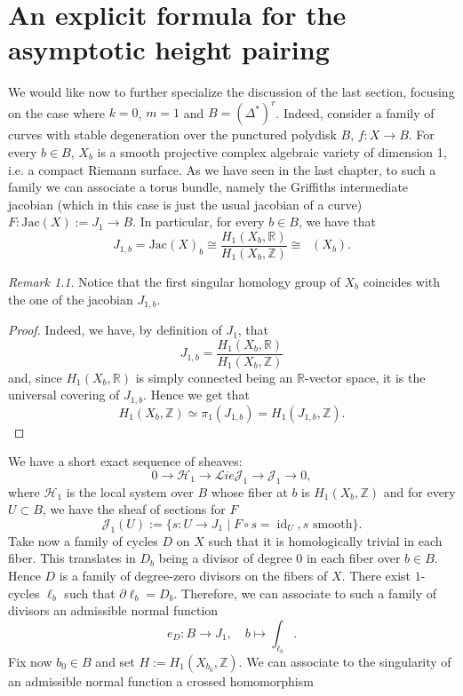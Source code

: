 \documentclass[a4paper,12 pt,titlepage,twoside]{book}
\newcommand{\numberset}{\mathbb}
\newcommand{\Z}{\numberset{Z}}
\newcommand{\R}{\numberset{R}}
\newcommand{\Lie}{\mathcal{L}ie}
\DeclareMathOperator{\id}{id}
\DeclareMathOperator{\pico}{Pic^0}
\theoremstyle{plain}
\theoremstyle{theorem}
\theoremstyle{definition}
\theoremstyle{remark}
\newtheorem{oss}[thm]{Remark}
\begin{document}
\chapter{An explicit formula for the asymptotic height pairing}\label{sec: an explicit formula for the ahp}
	We would like now to further specialize the discussion of the last section, focusing on the case where $k=0$, $m=1$ and $B = (\Delta^*)^r$. Indeed, consider a family of curves with stable degeneration over the punctured polydisk $B$, $ f \colon X \rightarrow B.$ For every $b \in B$, $X_b$ is a smooth projective complex algebraic variety of dimension 1, i.e. a compact Riemann surface. As we have seen in the last chapter, to such a family we can associate a torus bundle, namely the Griffiths intermediate jacobian (which in this case is just the usual jacobian of a curve) $F \colon \text{Jac}(X) := J_1 \rightarrow B.$ In particular, for every $b \in B$, we have that $$J_{1,b} = \text{Jac}(X)_b \cong \frac{H_1(X_b,\R)}{H_1(X_b,\Z)} \cong \pico(X_b).$$
	\begin{oss}
		Notice that the first singular homology group of $X_b$ coincides with the one of the jacobian $J_{1,b}$. 
	\end{oss}
	\begin{proof}
		Indeed, we have, by definition of $J_1$, that $$J_{1,b} = \frac{H_1(X_b,\R)}{H_1(X_b,\Z)}$$ and, since $H_1(X_b,\R)$ is simply connected being an $\R$-vector space, it is the universal covering of $J_{1,b}$. Hence we get that $$H_1(X_b,\Z) \simeq \pi_1(J_{1,b}) = H_1(J_{1,b},\Z).$$
	\end{proof}
	We have a short exact sequence of sheaves: $$0 \rightarrow \mathcal{H}_1 \rightarrow \Lie \mathcal{J}_1 \rightarrow \mathcal{J}_1 \rightarrow 0,$$ where $\mathcal{H}_1$ is the local system over $B$ whose fiber at $b$ is $H_1(X_b, \Z)$ and for every $U \subset B$, we have the sheaf of sections for $F$ $$\mathcal{J}_1(U) := \{s \colon U \rightarrow J_1 \mid F \circ s = \id_U, s \text{ smooth}\}.$$
	Take now a family of cycles $D$ on $X$ such that it is homologically trivial in each fiber. This translates in $D_b$ being a divisor of degree 0 in each fiber over $b \in B$. Hence $D$ is a family of degree-zero divisors on the fibers of $X$. There exist $1$-cycles $\ell_b$ such that $\partial \ell_b = D_b.$ Therefore, we can associate to such a family of divisors an admissible normal function $$e_D \colon B \rightarrow J_1,\quad b \mapsto \int_{\ell_b}.$$
	Fix now $b_0 \in B$ and set $H:= H_1(X_{b_0},\Z).$ We can associate to the singularity of an admissible normal function a crossed homomorphism
\end{document}
